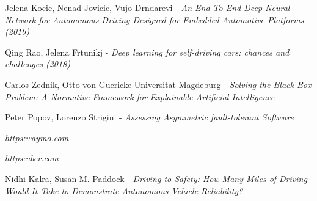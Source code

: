 \begin{thebibliography}{9}
Jelena Kocic, Nenad Jovicic, Vujo Drndarevi - \textit{An End-To-End Deep Neural Network for Autonomous Driving Designed for Embedded Automotive Platforms (2019)}

Qing Rao, Jelena Frtunikj - \textit{Deep learning for self-driving cars: chances and challenges (2018)}

Carlos Zednik, Otto-von-Guericke-Universitat Magdeburg - \textit{Solving the Black Box Problem: A Normative Framework for Explainable Artificial Intelligence}

Peter Popov, Lorenzo Strigini - \textit{Assessing Asymmetric fault-tolerant Software}

\textit{https:\/\/waymo.com\/}

\textit{https:\/\/uber.com\/}

Nidhi Kalra, Susan M. Paddock - \textit{Driving to Safety: How Many Miles of Driving Would It Take to Demonstrate Autonomous Vehicle Reliability?}

\end{thebibliography}